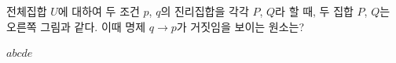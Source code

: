 \noindent\begin{minipage}[t]{0.58\linewidth}\vspace{0pt}\raggedright 전체집합 $U$에 대하여 두 조건 $p$, $q$의 진리집합을 각각 $P$, $Q$라 할 때, 두 집합 $P$, $Q$는 오른쪽 그림과 같다. 이때 명제 $q\longrightarrow p$가 거짓임을 보이는 원소는?\end{minipage}\hfill\begin{minipage}[t]{0.4\linewidth}\vspace{0pt}\centering \resizebox{\ifdim\width>\linewidth\linewidth\else\width\fi}{!}{}\end{minipage}\par
\begin{choices32}{$a$}{$b$}{$c$}{$d$}{$e$}\end{choices32}
